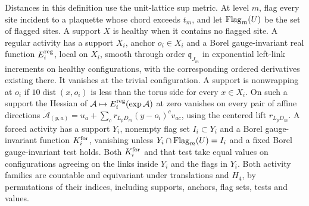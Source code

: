\begin{definition}\label{def:representations}
Distances in this definition use the unit-lattice sup metric. At level $m$, flag every site incident to a plaquette whose chord exceeds $t_m$, and let $\operatorname{Flag}_m(U)$ be the set of flagged sites. A support $X$ is healthy when it contains no flagged site. A regular activity has a support $X_i$, anchor $o_i\in X_i$ and a Borel gauge-invariant real function $E_i^{\rm reg}$, local on $X_i$, smooth through order $\mathfrak q_{J_m}$ in exponential left-link increments on healthy configurations, with the corresponding ordered derivatives existing there. It vanishes at the trivial configuration. A support is nonwrapping at $o_i$ if $10\operatorname{dist}(x,o_i)$ is less than the torus side for every $x\in X_i$. On such a support the Hessian of $\mathcal A\mapsto E_i^{\rm reg}(\exp\mathcal A)$ at zero vanishes on every pair of affine directions $\dot{\mathcal A}_{(y,a)}=u_a+\sum_c r_{L_pD_m}(y-o_i)^cv_{ac}$, using the centered lift $r_{L_pD_m}$. A forced activity has a support $Y_i$, nonempty flag set $I_i\subset Y_i$ and a Borel gauge-invariant function $K_i^{\rm for}$, vanishing unless $Y_i\cap\operatorname{Flag}_m(U)=I_i$ and a fixed Borel gauge-invariant test holds. Both $K_i^{\rm for}$ and that test take equal values on configurations agreeing on the links inside $Y_i$ and the flags in $Y_i$. Both activity families are countable and equivariant under translations and $H_4$, by permutations of their indices, including supports, anchors, flag sets, tests and values.


\end{definition}
